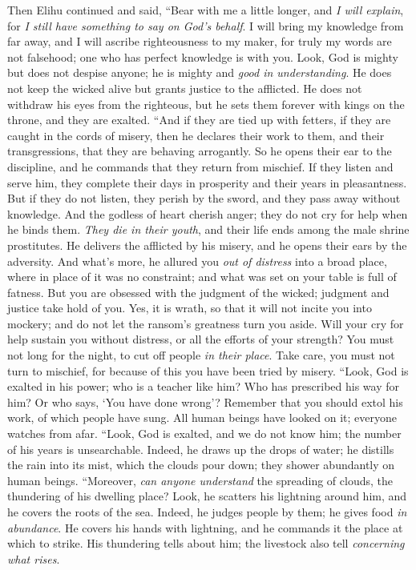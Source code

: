 \begin{biblechapter} %
 Then Elihu continued and said,
\verse “Bear with me a little longer, and \textit{I will explain}, 
for \textit{I still have something to say on God’s behalf}.
\verse I will bring my knowledge from far away, 
and I will ascribe righteousness to my maker,
\verse for truly my words are not falsehood; 
one who has perfect knowledge is with you.
\verse Look, God is mighty but does not despise anyone; 
he is mighty and \textit{good in understanding}.
\verse He does not keep the wicked alive 
but grants justice to the afflicted.
\verse He does not withdraw his eyes from the righteous, 
but he sets them forever with kings on the throne, and they are exalted.
\verse “And if they are tied up with fetters, 
if they are caught in the cords of misery,
\verse then he declares their work to them, 
and their transgressions, that they are behaving arrogantly.
\verse So he opens their ear to the discipline, 
and he commands that they return from mischief.
\verse If they listen and serve him, 
they complete their days in prosperity and their years in pleasantness.
\verse But if they do not listen, they perish by the sword, 
and they pass away without knowledge.
\verse And the godless of heart cherish anger; 
they do not cry for help when he binds them.
\verse \textit{They die in their youth}, 
and their life ends among the male shrine prostitutes.
\verse He delivers the afflicted by his misery, 
and he opens their ears by the adversity.
\verse And what’s more, he allured you \textit{out of distress} 
into a broad place, where in place of it was no constraint; 
and what was set on your table is full of fatness.
\verse But you are obsessed with the judgment of the wicked; 
judgment and justice take hold of you.
\verse Yes, it is wrath, so that it will not incite you into mockery; 
and do not let the ransom’s greatness turn you aside.
\verse Will your cry for help sustain you without distress, 
or all the efforts of your strength?
\verse You must not long for the night, 
to cut off people \textit{in their place}.
\verse Take care, you must not turn to mischief, 
for because of this you have been tried by misery.
\verse “Look, God is exalted in his power; 
who is a teacher like him?
\verse Who has prescribed his way for him? 
Or who says, ‘You have done wrong’?
\verse Remember that you should extol his work, 
of which people have sung.
\verse All human beings have looked on it; 
everyone watches from afar.
\verse “Look, God is exalted, and we do not know him; 
the number of his years is unsearchable.
\verse Indeed, he draws up the drops of water; 
he distills the rain into its mist,
\verse which the clouds pour down; 
they shower abundantly on human beings.
\verse “Moreover, \textit{can anyone understand} the spreading of clouds, 
the thundering of his dwelling place?
\verse Look, he scatters his lightning around him, 
and he covers the roots of the sea.
\verse Indeed, he judges people by them; 
he gives food \textit{in abundance}.
\verse He covers his hands with lightning, 
and he commands it the place at which to strike.
\verse His thundering tells about him; 
the livestock also tell \textit{concerning what rises}.
\end{biblechapter}

